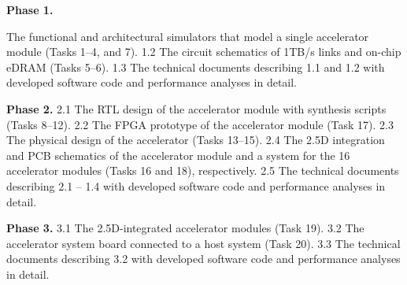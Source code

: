 


\noindent
\textbf{Phase 1.}

 The functional and architectural simulators that model a single accelerator module (Tasks 1--4, and 7).
1.2 The circuit schematics of 1TB/s links and on-chip eDRAM (Tasks 5--6). 
1.3 The technical documents describing 1.1 and 1.2 with developed software code and performance analyses in detail.

\noindent
\textbf{Phase 2.}
2.1 The RTL design of the accelerator module with synthesis scripts (Tasks 8--12).
2.2 The FPGA prototype of the accelerator module (Task 17).
2.3 The physical design of the accelerator (Tasks 13--15).
2.4 The 2.5D integration and PCB schematics of the accelerator module and a system for the 16 accelerator modules (Tasks 16 and 18), respectively.
2.5 The technical documents describing 2.1 -- 1.4 with developed software code and performance analyses in detail.


\noindent
\textbf{Phase 3.}
3.1 The 2.5D-integrated accelerator modules (Task 19).
3.2 The accelerator system board connected to a host system (Task 20).
3.3 The technical documents describing 3.2 with developed software code and performance analyses in detail.
